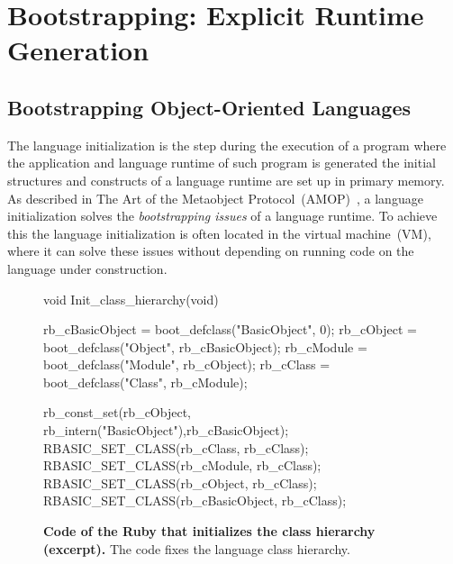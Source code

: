 
\part{Bootstrapping: Explicit Runtime Generation}
\chapter{Bootstrapping Object-Oriented Languages}
\minitoc
\introduction

The language initialization is the step during the execution of a program where the application and language runtime of such program is generated \ie the initial structures and constructs of a language runtime are set up in primary memory.
As described in The Art of the Metaobject Protocol~(AMOP)~\cite{Kicz91a}, a language initialization solves the \emph{bootstrapping issues} of a language runtime. To achieve this the language initialization is often located in the virtual machine~(VM), where it can solve these issues without depending on running code on the language under construction.

\begin{figure}[ht!]
\begin{code}
void Init_class_hierarchy(void) {
    rb_cBasicObject = boot_defclass("BasicObject", 0);
    rb_cObject = boot_defclass("Object", rb_cBasicObject);
    rb_cModule = boot_defclass("Module", rb_cObject);
    rb_cClass =  boot_defclass("Class",  rb_cModule);

    rb_const_set(rb_cObject, rb_intern("BasicObject"),rb_cBasicObject);
    RBASIC_SET_CLASS(rb_cClass, rb_cClass);
    RBASIC_SET_CLASS(rb_cModule, rb_cClass);
    RBASIC_SET_CLASS(rb_cObject, rb_cClass);
    RBASIC_SET_CLASS(rb_cBasicObject, rb_cClass);
}
\end{code}
\caption{\textbf{Code of the Ruby \VM that initializes the class hierarchy (excerpt).} The \VM code fixes the language class hierarchy.\label{code:ruby_hierarchy}}
\end{figure}

